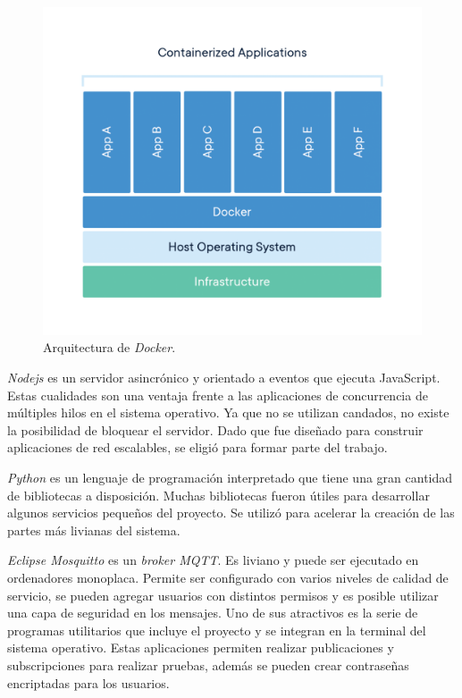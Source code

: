 \begin{figure}[h]
	\centering
	\includegraphics[width=\textwidth]{./Figures/ch2DockerContainer.png}
	\caption{Arquitectura de \emph{Docker}. \citep{WEBSITE:WhatContainer}}
	\label{fig:ch2WhatContainer}
\end{figure}

\emph{Nodejs} es un servidor asincrónico y orientado a eventos que ejecuta JavaScript.
Estas cualidades son una ventaja frente a las aplicaciones de concurrencia de múltiples hilos en el sistema operativo.
Ya que no se utilizan candados, no existe la posibilidad de bloquear el servidor.
Dado que fue diseñado para construir aplicaciones de red escalables, se eligió para formar parte del trabajo.

\emph{Python} es un lenguaje de programación interpretado que tiene una gran cantidad de bibliotecas a disposición.
Muchas bibliotecas fueron útiles para desarrollar algunos servicios pequeños del proyecto.
Se utilizó para acelerar la creación de las partes más livianas del sistema.

\emph{Eclipse Mosquitto} es un \emph{broker MQTT}.
Es liviano y puede ser ejecutado en ordenadores monoplaca.
Permite ser configurado con varios niveles de calidad de servicio, se pueden agregar usuarios con distintos permisos y es posible utilizar una capa de seguridad en los mensajes.
Uno de sus atractivos es la serie de programas utilitarios que incluye el proyecto y se integran en la terminal del sistema operativo.
Estas aplicaciones permiten realizar publicaciones y subscripciones para realizar pruebas, además se pueden crear contraseñas encriptadas para los usuarios.

